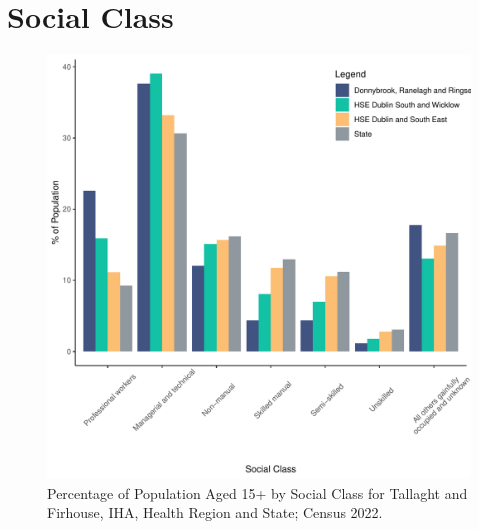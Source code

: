 \documentclass{article}
\begin{document}
\section{Social Class}\label{sect:SC}
\begin{figure}[H]
	\centering
	\includegraphics[width = 140mm]{../figures/SocialClassED.pdf}
	\caption{Percentage of Population Aged 15+ by Social Class for Tallaght and Firhouse, IHA, Health Region and State; Census 2022.}
	\label{fig:vbnv}
	\end{figure}
\end{document}
